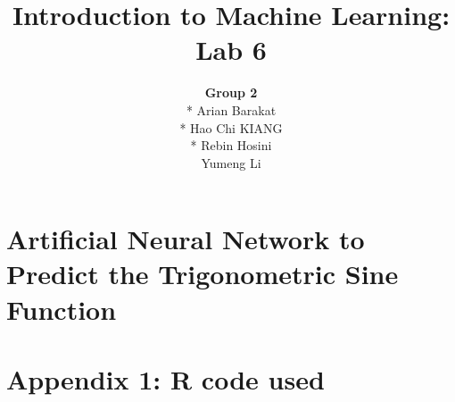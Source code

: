 \documentclass[11pt,english]{article}
\begin{document}
\author{\textbf{Group 2} \\* Arian Barakat \\* Hao Chi KIANG \\* Rebin Hosini \\ Yumeng Li}
\title{Introduction to Machine Learning: Lab 6}
\maketitle

\section*{Artificial Neural Network to Predict the
  Trigonometric Sine Function}





\newpage
{}

\newpage
\section*{Appendix 1: R code used}
\label{ax2}

\end{document}
